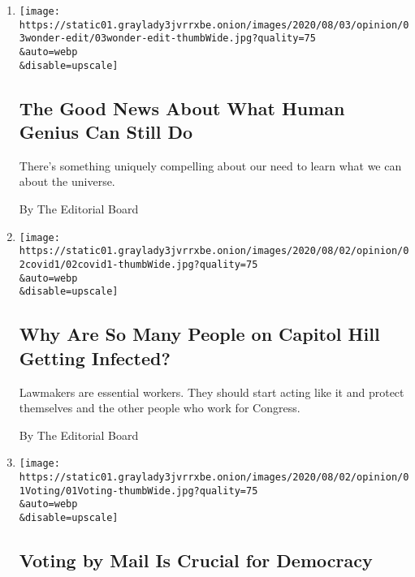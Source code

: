 \begin{enumerate}
\def\labelenumi{\arabic{enumi}.}
\item
  \href{/2020/08/03/opinion/spacex-stonehenge-mars.html}{}

  \texttt{[image: https://static01.graylady3jvrrxbe.onion/images/2020/08/03/opinion/03wonder-edit/03wonder-edit-thumbWide.jpg?quality=75\\\&auto=webp\\\&disable=upscale]}

  \hypertarget{the-good-news-about-what-human-genius-can-still-do}{%
  \subsection{The Good News About What Human Genius Can Still
  Do}\label{the-good-news-about-what-human-genius-can-still-do}}

  There's something uniquely compelling about our need to learn what we
  can about the universe.

  By The Editorial Board
\item
  \href{/2020/08/02/opinion/coronavirus-gohmert-congress-testing.html}{}

  \texttt{[image: https://static01.graylady3jvrrxbe.onion/images/2020/08/02/opinion/02covid1/02covid1-thumbWide.jpg?quality=75\\\&auto=webp\\\&disable=upscale]}

  \hypertarget{why-are-so-many-people-on-capitol-hill-getting-infected}{%
  \subsection{Why Are So Many People on Capitol Hill Getting
  Infected?}\label{why-are-so-many-people-on-capitol-hill-getting-infected}}

  Lawmakers are essential workers. They should start acting like it and
  protect themselves and the other people who work for Congress.

  By The Editorial Board
\item
  \href{/2020/08/01/opinion/sunday/mail-voting-covid-2020-election.html}{}

  \texttt{[image: https://static01.graylady3jvrrxbe.onion/images/2020/08/02/opinion/01Voting/01Voting-thumbWide.jpg?quality=75\\\&auto=webp\\\&disable=upscale]}

  \hypertarget{voting-by-mail-is-crucial-for-democracy}{%
  \subsection{Voting by Mail Is Crucial for
  Democracy}\label{voting-by-mail-is-crucial-for-democracy}}


\end{enumerate}
